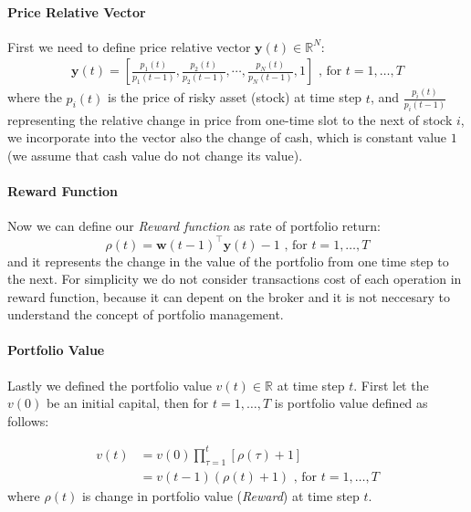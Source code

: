 \documentclass[../xlapes02]{subfiles}
\begin{document}
    \paragraph{Price Relative Vector}\label{par:price-relative-vector}
    First we need to define price relative vector $\bm{y}(t) \in \mathbb{R}^N$:
    \begin{equation}
        \label{eq:price-relative-vector}
        \begin{split}
            \bm{y}(t)=\left[\frac{p_1(t)}{p_1(t-1)}, \frac{p_2(t)}{p_2(t-1)}, \cdots, \frac{p_N(t)}{p_N(t-1)}, 1\right]\text{ , for }t=1,\ldots,T
        \end{split}
    \end{equation}
    where the $p_i(t)$ is the price of risky asset (stock) at time step $t$, and $\frac{p_i(t)}{p_i(t-1)}$ representing the relative change in price from one-time slot to the next of stock $i$, we incorporate into the vector also the change of cash, which is constant value $1$ (we assume that cash value do not change its value).

    \paragraph{Reward Function}\label{par:reward-function}
    Now we can define our \emph{Reward function} as rate of portfolio return:
    \begin{equation}
        \label{eq:rate-of-portfolio-return}
        \rho(t)=\bm{w}(t-1)^\top\bm{y}(t)-1\text{ , for }t=1,\ldots,T
    \end{equation}
    and it represents the change in the value of the portfolio from one time step to the next. For simplicity we do not consider transactions cost of each operation in reward function, because it can depent on the broker and it is not neccesary to understand the concept of portfolio management.

    \paragraph{Portfolio Value}\label{par:new-portfolio-value}
    Lastly we defined the portfolio value $v(t) \in \mathbb{R}$ at time step $t$. First let the $v(0)$ be an initial capital, then for $t=1,\ldots,T$ is portfolio value defined as follows:

    \begin{equation}
        \label{eq:relative-portfolio-value}
        \begin{split}
        v(t) &=v(0)\prod_{\tau=1}^{t}\left[\rho(\tau)+1\right]\\
        &=v(t-1)(\rho(t)+1)
        \text{ , for }t=1,\ldots,T
        \end{split}
    \end{equation}
    where $\rho(t)$ is change in portfolio value (\emph{Reward}) at time step $t$.
\end{document}
